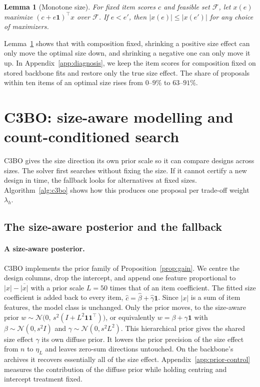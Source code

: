 \documentclass{article}
\newcommand{\revtext}[1]{{\color{blue}#1}}
\providecommand{\one}{\mathbf 1}
\providecommand{\F}{\mathcal F}
\newtheorem{lemma}[proposition]{Lemma}
\theoremstyle{remark}\newtheorem{remark}[proposition]{Remark}
\begin{document}
\begin{lemma}[\revtext{Monotone size}]\label{lem:mono}
\revtext{For fixed item scores $c$ and feasible set $\F$, let $x(e)$ maximize $(c+e\one)^\top x$ over $\F$. If $e<e'$, then $|x(e)|\le |x(e')|$ for any choice of maximizers.}
\end{lemma}

\revtext{Lemma~\ref{lem:mono} shows that with composition fixed, shrinking a positive size effect can only move the optimal size down, and shrinking a negative one can only move it up.}
\revtext{In Appendix~\ref{app:diagnosis}, we keep the item scores for composition fixed on stored backbone fits and restore only the true size effect. The share of proposals within ten items of an optimal size rises from $0$--$9\%$ to $63$--$91\%$.}

\section{C3BO: size-aware modelling and count-conditioned search}\label{sec:method}

\revtext{C3BO gives the size direction its own prior scale so it can compare designs across sizes. The solver first searches without fixing the size. If it cannot certify a new design in time, the fallback looks for alternatives at fixed sizes. Algorithm~\ref{alg:c3bo} shows how this produces one proposal per trade-off weight $\lambda_h$.}

\subsection{The size-aware posterior and the fallback}\label{sec:learn}

\paragraph{A size-aware posterior.}
C3BO implements the prior family of Proposition~\ref{prop:gain}. We centre the
design columns, drop the intercept, and append one feature proportional to
$|x|-\overline{|x|}$ with a prior scale $L=50$ times that of an item coefficient.
The fitted size coefficient is added back to every item,
$\hat c=\hat\beta+\hat\gamma\one$. Since $|x|$ is a sum of item features, the
model class is unchanged. Only the prior moves, to \revtext{the size-aware prior}
$w\sim\mathcal N\bigl(0,\,s^2(I+L^2\one\one^\top)\bigr)$\revtext{, or equivalently $w=\beta+\gamma\one$ with $\beta\sim\mathcal N(0,s^2I)$ and $\gamma\sim\mathcal N(0,s^2L^2)$. This hierarchical prior gives the shared size effect $\gamma$ its own diffuse prior. It} lowers the prior
precision of the size effect from $n$ to $\eta_L$ and leaves zero-sum
directions untouched. \revtext{On the backbone's archives it recovers essentially all of the size effect.}
\revtext{Appendix~\ref{app:prior-control} measures the contribution of the diffuse prior while holding centring and intercept treatment fixed.}
\end{document}

